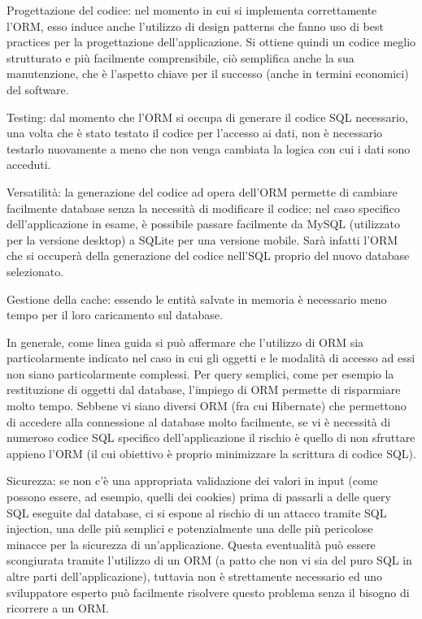 Progettazione del codice: nel momento in cui si implementa correttamente l'ORM, esso induce anche l'utilizzo di design patterns che fanno uso di best practices per la progettazione dell'applicazione. Si ottiene quindi un codice meglio strutturato e più facilmente comprensibile, ciò semplifica anche la sua manutenzione, che è l'aspetto chiave per il successo (anche in termini economici) del software.

Testing: dal momento che l'ORM si occupa di generare il codice SQL necessario, una volta che è stato testato il codice per l'accesso ai dati, non è necessario testarlo nuovamente a meno che non venga cambiata la logica con cui i dati sono acceduti. 

Versatilità: la generazione del codice ad opera dell'ORM permette di cambiare facilmente database senza la necessità di modificare il codice; nel caso specifico dell'applicazione in esame, è possibile passare facilmente da MySQL (utilizzato per la versione desktop) a SQLite per una versione mobile. Sarà infatti l'ORM che si occuperà della generazione del codice nell'SQL proprio del nuovo database selezionato.

Gestione della cache: essendo le entità salvate in memoria è necessario meno tempo per il loro caricamento sul database.

In generale, come linea guida si può affermare che l'utilizzo di ORM sia particolarmente indicato nel caso in cui gli oggetti e le modalità di accesso ad essi non siano particolarmente complessi. Per query semplici, come per esempio la restituzione di oggetti dal database, l'impiego di ORM permette di risparmiare molto tempo. Sebbene vi siano diversi ORM (fra cui Hibernate) che permettono di accedere alla connessione al database molto facilmente, se vi è necessità di numeroso codice SQL specifico dell'applicazione il rischio è quello di non sfruttare appieno l'ORM (il cui obiettivo è proprio minimizzare la scrittura di codice SQL).

Sicurezza: se non c'è una appropriata validazione dei valori in input (come possono essere, ad esempio, quelli dei cookies) prima di passarli a delle query SQL eseguite dal database, ci si espone al rischio di un attacco tramite SQL injection, una delle più semplici e potenzialmente una delle più pericolose minacce per la sicurezza di un'applicazione. Questa eventualità può essere scongiurata tramite l'utilizzo di un ORM (a patto che non vi sia del puro SQL in altre parti dell'applicazione), tuttavia non è strettamente necessario ed uno sviluppatore esperto può facilmente risolvere questo problema senza il bisogno di ricorrere a un ORM.

